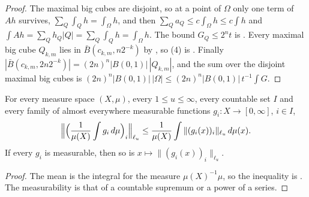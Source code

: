 \begin{proof}
\leanok
The maximal big cubes are disjoint, so at a point of $\Omega$ only one term of $A h$ survives,
$\sum_Q \int_Q h = \int_\Omega h$, and then $\sum_Q a_Q \leq c \int_\Omega h \leq c \int h$ and
$\int A h = \sum_Q h_Q |Q| = \sum_Q \int_Q h = \int_\Omega h$. The bound $G_Q \leq 2^n t$ is
. Every maximal big cube $Q_{k,m}$ lies in
$\bar B(c_{k,m}, n 2^{-k})$ by , so (4) is
. Finally
$|\bar B(c_{k,m}, 2 n 2^{-k})| = (2n)^n |B(0,1)| \, |Q_{k,m}|$, and the sum over the disjoint
maximal big cubes is $(2n)^n |B(0,1)| \, |\Omega| \leq (2n)^n |B(0,1)| \, t^{-1} \int G$.
\end{proof}

\begin{lemma}
\label{lem:lq-norm-means}
\leanok
{}
For every measure space $(X, \mu)$, every $1 \leq u \leq \infty$, every countable set $I$ and
every family of almost everywhere measurable functions $g_i : X \to [0, \infty]$, $i \in I$,
\[
  \Bigl\| \Bigl( \frac{1}{\mu(X)} \int g_i \, d\mu \Bigr)_i \Bigr\|_{\ell_u}
  \leq \frac{1}{\mu(X)} \int \|(g_i(x))_i\|_{\ell_u} \, d\mu(x) .
\]
If every $g_i$ is measurable, then so is $x \mapsto \|(g_i(x))_i\|_{\ell_u}$.
\end{lemma}

\begin{proof}
\leanok
The mean is the integral for the measure $\mu(X)^{-1} \mu$, so the inequality is
. The measurability is that of a countable supremum or a power of
a series.
\end{proof}

